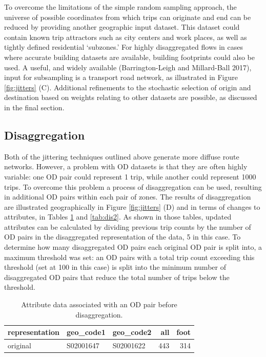 \documentclass[
]{article}
\begin{document}
To overcome the limitations of the simple random sampling approach, the universe of possible coordinates from which trips can originate and end can be reduced by providing another geographic input dataset.
This dataset could contain known trip attractors such as city centers and work places, as well as tightly defined residential `subzones.'
For highly disaggregated flows in cases where accurate building datasets are available, building footprints could also be used.
A useful, and widely available (Barrington-Leigh and Millard-Ball 2017), input for subsampling is a transport road network, as illustrated in Figure \ref{fig:jitters} (C).
Additional refinements to the stochastic selection of origin and destination based on weights relating to other datasets are possible, as discussed in the final section.

\hypertarget{disaggregation}{%
\subsection{Disaggregation}\label{disaggregation}}

Both of the jittering techniques outlined above generate more diffuse route networks.
However, a problem with OD datasets is that they are often highly variable: one OD pair could represent 1 trip, while another could represent 1000 trips.
To overcome this problem a process of disaggregation can be used, resulting in additional OD pairs within each pair of zones.
The results of disaggregation are illustrated geographically in Figure \ref{fig:jitters} (D) and in terms of changes to attributes, in Tables \ref{tab:dis1} and \ref{tab:dis2}.
As shown in those tables, updated attributes can be calculated by dividing previous trip counts by the number of OD pairs in the disaggregated representation of the data, 5 in this case.
To determine how many disaggregated OD pairs each original OD pair is split into, a maximum threshold was set: an OD pairs with a total trip count exceeding this threshold (set at 100 in this case) is split into the minimum number of disaggregated OD pairs that reduce the total number of trips below the threshold.

\begin{table}

\caption{\label{tab:dis1}Attribute data associated with an OD pair before disaggregation.}
\centering
\begin{tabular}[t]{lllrr}
\toprule
representation & geo\_code1 & geo\_code2 & all & foot\\
\midrule
original & S02001647 & S02001622 & 443 & 314\\
\bottomrule
\end{tabular}
\end{table}
\end{document}
